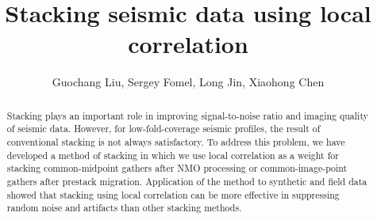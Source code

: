 \title{Stacking seismic data using local correlation}

\renewcommand{\thefootnote}{\fnsymbol{footnote}}


\address{
\footnotemark[1] State Key Laboratory of Petroleum Resources and Prospecting\\
China University of Petroleum\\
Beijing, China \\
\footnotemark[2] Bureau of Economic Geology,\\
John A. and Katherine G. Jackson School of Geosciences \\
The University of Texas at Austin \\
University Station, Box X \\
Austin, TX, USA, 78713-8924 \\
\footnotemark[3] Institute for Geophysics,\\
John A. and Katherine G. Jackson School of Geosciences \\
The University of Texas at Austin \\
Austin, TX, USA, 78713-8924
}

\author{Guochang Liu\footnotemark[1]\footnotemark[2], Sergey Fomel\footnotemark[2], Long Jin\footnotemark[3], Xiaohong Chen\footnotemark[1]}

\maketitle

\begin{abstract}

Stacking plays an important role in improving signal-to-noise ratio and imaging 
quality of seismic data. However, for low-fold-coverage seismic profiles, the 
result of conventional stacking is not always satisfactory. To address this 
problem, we have developed a method of stacking in which we use local 
correlation as a weight for stacking common-midpoint gathers after NMO 
processing or common-image-point gathers after prestack migration. Application 
of the method to synthetic and field data showed that stacking using local
correlation can be more effective in suppressing random noise and artifacts 
than other stacking methods.

\end{abstract}

